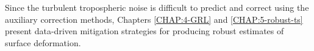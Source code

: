  
Since the turbulent tropospheric noise is difficult to predict and correct using the auxiliary correction methods, Chapters \ref{CHAP:4-GRL} and \ref{CHAP:5-robust-ts} present data-driven mitigation strategies for producing robust estimates of surface deformation.









